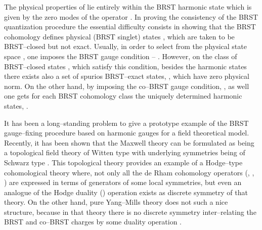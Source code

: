 \documentclass[a4paper,11pt]{article}
\begin{document}
The physical properties of \myHighlight{$\psi$}\coordHE{} lie entirely within the 
BRST harmonic state \myHighlight{$\omega$}\coordHE{} which is given by the zero modes of the
operator \myHighlight{$\Delta$}\coordHE{}. In proving the consistency of the BRST quantization
procedure the essential difficulty consists in showing that the BRST
cohomology defines physical (BRST singlet) states 
\coordHE{}, which are
taken to be BRST--closed but not exact. Usually, in order to select from 
\coordHE{} the physical state space \coordHE{}, one imposes the 
BRST gauge condition \coordHE{} \cite{10} -- \cite{12}. However,
on the class of BRST--closed states \coordHE{}, which satisfy 
this condition, besides the harmonic states \myHighlight{$\omega$}\coordHE{} there exists also 
a set of spurios BRST--exact states, \coordHE{}, which have zero physical
norm. On the other hand, by imposing the co--BRST gauge condition, 
\coordHE{}, as well one gets for each BRST cohomology class the 
uniquely determined harmonic states, \myHighlight{$\psi = \omega$}\coordHE{}.

It has been a long--standing problem to give a prototype example of the
BRST gauge--fixing procedure based on harmonic gauges for a field theoretical
model. Recently, it has been shown that the \coordHE{} Maxwell theory can 
be formulated as being a topological field theory of Witten type with 
underlying symmetries being 
of Schwarz type \cite{13}. This topological theory provides an example 
of a Hodge--type cohomological theory where, not only all the de Rham 
cohomology operators (\coordHE{}, \myHighlight{$\delta$}\coordHE{}, \myHighlight{$\Delta$}\coordHE{}) are expressed in terms of 
generators of some local symmetries, but even an analogue of the Hodge 
duality (\myHighlight{$\star$}\coordHE{}) operation exists as discrete 
symmetry of that theory. On the other hand, pure 
\coordHE{} Yang--Mills theory does not such a nice structure, because in that 
theory there is no discrete symmetry inter--relating the BRST and co--BRST 
charges by some duality operation \cite{14}.    
\end{document}
